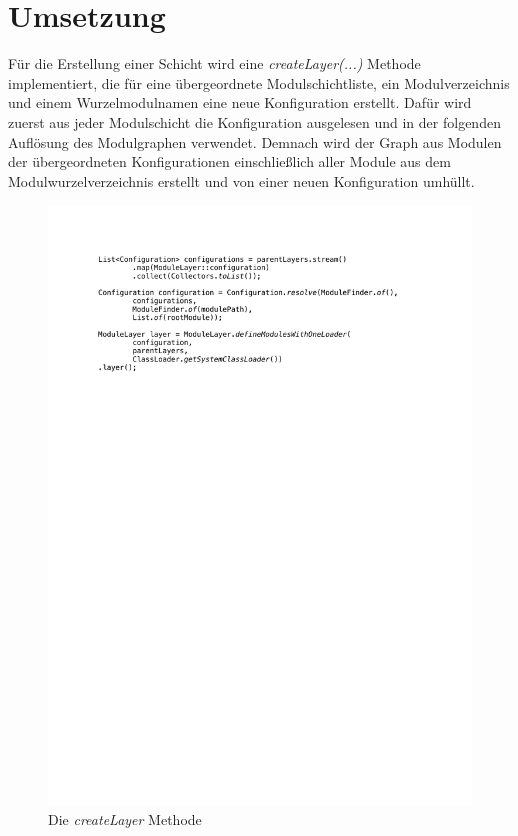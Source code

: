 \section{Umsetzung}\label{sec:umsetzung}
	Für die Erstellung einer Schicht wird eine \textit{createLayer(...)} Methode implementiert, die für eine übergeordnete Modulschichtliste, ein Modulverzeichnis und einem Wurzelmodulnamen eine neue Konfiguration erstellt. Dafür wird zuerst aus jeder Modulschicht die Konfiguration ausgelesen und in der folgenden Auflösung des Modulgraphen verwendet. Demnach wird der Graph aus Modulen der übergeordneten Konfigurationen einschließlich aller Module aus dem Modulwurzelverzeichnis erstellt und von einer neuen Konfiguration umhüllt.\bigbreak
	\begin{figure}[h!]
		   \centering
		   \captionsetup{justification=centering}
		   \includegraphics[width=\textwidth]{material/images/umsetzung/configs.pdf}
		   \caption{Die \textit{createLayer} Methode}
		   \label{fig:layerCreation}
	\end{figure}
